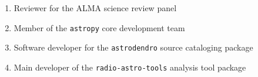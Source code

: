 \documentclass[12pt]{article}
\begin{document}
%




%

\begin{enumerate}[topsep=0pt,itemsep=-1ex,partopsep=1ex,parsep=1ex]
    \item Reviewer for the ALMA science review panel
    \item Member of the \texttt{astropy} core development team
    \item Software developer for the \texttt{astrodendro} source cataloging package
    \item Main developer of the \texttt{radio-astro-tools} analysis tool package
%
\end{enumerate}


%
%
\end{document}
